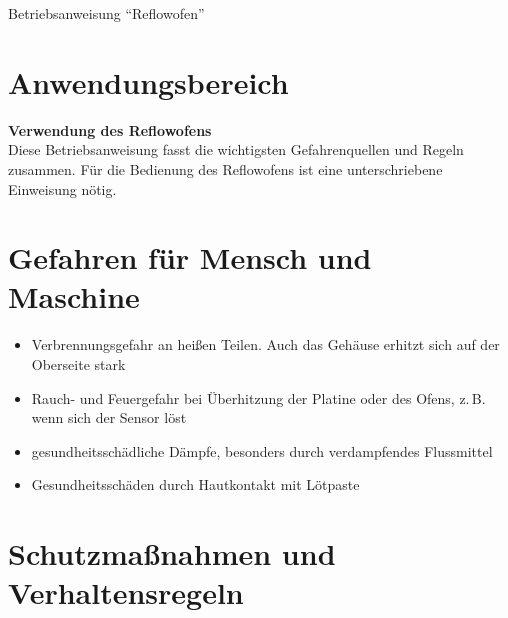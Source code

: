 \documentclass[fontsize=11pt]{scrartcl}
\begin{document}

\begin{center}
	\LARGE{Betriebsanweisung \enquote{Reflowofen}}
\end{center}


\section{Anwendungsbereich}
\begin{center}
\textbf{Verwendung des Reflowofens}\\
	Diese Betriebsanweisung fasst die wichtigsten Gefahrenquellen und Regeln zusammen. 	Für die Bedienung des Reflowofens ist eine unterschriebene Einweisung nötig.
\end{center}



\section{Gefahren für Mensch und Maschine}

\begin{itemize}
	\item Verbrennungsgefahr an heißen Teilen. Auch das Gehäuse erhitzt sich auf der Oberseite stark
	\item Rauch- und Feuergefahr bei Überhitzung der Platine oder des Ofens, z.\,B. wenn sich der Sensor löst
	\item gesundheitsschädliche Dämpfe, besonders durch verdampfendes Flussmittel
	\item Gesundheitsschäden durch Hautkontakt mit Lötpaste
\end{itemize}

\section{Schutzmaßnahmen und Verhaltensregeln}
\end{document}
